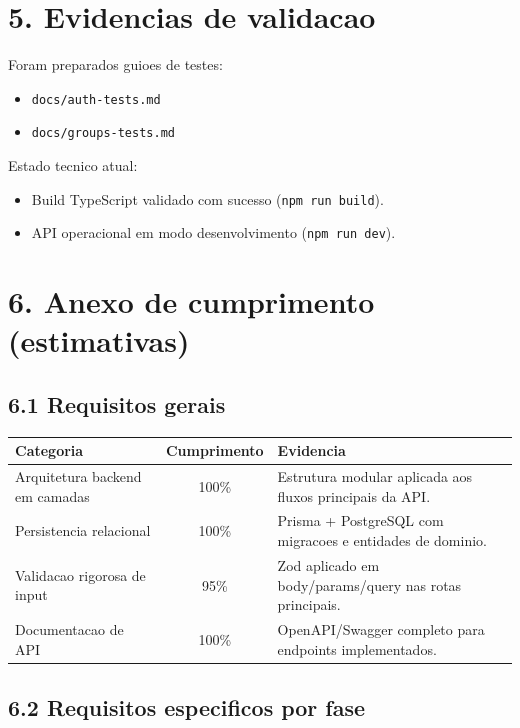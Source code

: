 \documentclass[11pt,a4paper]{article}
\begin{document}
\section*{5. Evidencias de validacao}

Foram preparados guioes de testes:

\begin{itemize}
  \item \texttt{docs/auth-tests.md}
  \item \texttt{docs/groups-tests.md}
\end{itemize}

Estado tecnico atual:

\begin{itemize}
  \item Build TypeScript validado com sucesso (\texttt{npm run build}).
  \item API operacional em modo desenvolvimento (\texttt{npm run dev}).
\end{itemize}

\section*{6. Anexo de cumprimento (estimativas)}

\subsection*{6.1 Requisitos gerais}

\begin{tabularx}{\textwidth}{|l|c|X|}
\hline
\textbf{Categoria} & \textbf{Cumprimento} & \textbf{Evidencia} \\
\hline
Arquitetura backend em camadas & 100\% & Estrutura modular aplicada aos fluxos principais da API. \\
\hline
Persistencia relacional & 100\% & Prisma + PostgreSQL com migracoes e entidades de dominio. \\
\hline
Validacao rigorosa de input & 95\% & Zod aplicado em body/params/query nas rotas principais. \\
\hline
Documentacao de API & 100\% & OpenAPI/Swagger completo para endpoints implementados. \\
\hline
\end{tabularx}

\subsection*{6.2 Requisitos especificos por fase}
\end{document}
